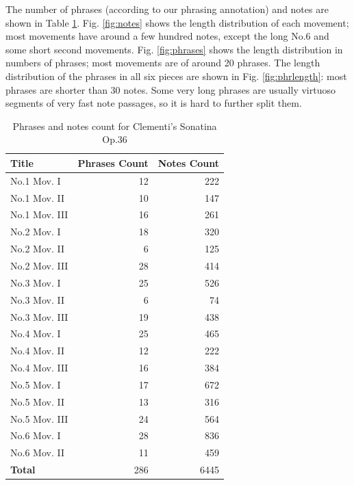 The number of phrases (according to our phrasing annotation) and notes are shown in Table \ref{tab:clemcount}. Fig. \ref{fig:notes} shows the length distribution of each movement; most movements have around a few hundred notes, except the long No.6 and some short second movements. Fig. \ref{fig:phrases} shows the length distribution in numbers of phrases; most movements are of around 20 phrases. The length distribution of the phrases in all six pieces are shown in Fig. \ref{fig:phrlength}: most phrases are shorter than 30 notes. Some very long phrases are usually virtuoso segments of very fast note passages, so it is hard to further split them.

\begin{table}[bp]
   \centering
   \caption{Phrases and notes count for Clementi's Sonatina Op.36}
   \label{tab:clemcount}
   \begin{tabular}{l|rr}
      \hline
      \textbf{Title}&\textbf{Phrases Count}&\textbf{Notes Count}\\
      \hline
      No.1 Mov. I&12&222\\
      No.1 Mov. II&10&147\\
      No.1 Mov. III&16&261\\
      No.2 Mov. I&18&320\\
      No.2 Mov. II&6&125\\
      No.2 Mov. III&28&414\\
      No.3 Mov. I&25&526\\
      No.3 Mov. II&6&74\\
      No.3 Mov. III&19&438\\
      No.4 Mov. I&25&465\\
      No.4 Mov. II&12&222\\
      No.4 Mov. III&16&384\\
      No.5 Mov. I&17&672\\
      No.5 Mov. II&13&316\\
      No.5 Mov. III&24&564\\
      No.6 Mov. I&28&836\\
      No.6 Mov. II&11&459\\
      \hline
      \textbf{Total} &286&6445\\
      \hline
   \end{tabular}
\end{table}


